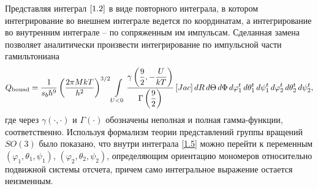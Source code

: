 \documentclass[
  14pt,
  a1paper,
  portrait, 
  margin=0mm,
  innermargin=15mm,
  blockverticalspace=0mm,
  colspace=0mm,
  subcolspace=0mm
]{tikzposter}
\newcommand{\lb}{\left(}
\newcommand{\rb}{\right)}
\newcommand{\lsq}{\left[}
\newcommand{\rsq}{\right]}
\begin{document}
\begin{columns}
{	Представляя интеграл $\eqref{1.2}$ в виде повторного интеграла, в котором интегрирование во внешнем интеграле ведется по координатам, а интегрирование во внутренним интеграле -- по сопряженным им импульсам. Сделанная замена позволяет аналитически произвести интегрирование по импульсной части гамильтониана 
	\vspace*{-0.7cm}
	\begin{gather}
			Q_\textup{bound} = \frac{1}{s_b h^9} \lb \frac{2 \pi M k T}{h^2} \rb^{3/2} \int\limits_{U < 0} \frac{\displaystyle \gamma \lb \frac{9}{2}, - \frac{U}{k T} \rb}{\displaystyle \Gamma \lb \frac{9}{2} \rb} \lsq Jac \rsq dR \, d\Theta \, d\Phi \, d\varphi_1^t \, d\theta_1^t \, d\psi_1^t \, d\varphi_2^t \, d\theta_2^t \, d\psi_2^t, \label{1.5}
	\end{gather}
	где через $\gamma( \cdot, \cdot)$ и $\Gamma(\cdot)$ обозначены неполная и полная гамма-функции, соответственно. Используя формализм теории представлений группы вращений $SO(3)$ было показано, что внутри интеграла \eqref{1.5} можно перейти к переменным $\lb \varphi_1, \theta_1, \psi_1 \rb$, $\lb \varphi_2, \theta_2, \psi_2 \rb$, определяющим ориентацию мономеров относительно подвижной системы отсчета, причем само интегральное выражение остается неизменным. 

}
\end{columns}
\end{document}
